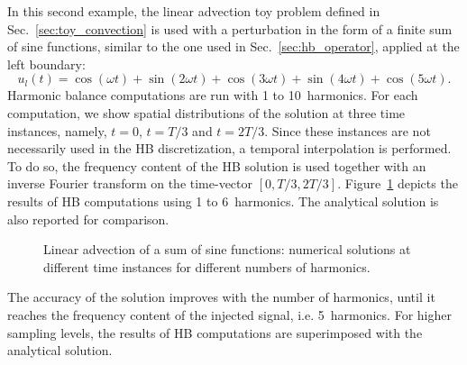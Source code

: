 
In this second example, the linear advection toy problem 
defined in Sec.~\ref{sec:toy_convection} is used with
a perturbation 
in the form of a finite sum of sine functions, similar to the one used
in Sec.~\ref{sec:hb_operator},
applied at the left boundary:
\begin{equation}
    u_l(t) = \cos(\omega t) + \sin(2 \omega t) +
    \cos(3 \omega t) + \sin(4 \omega t) + \cos(5 \omega t).
    \label{eq:sum_injected_fct}
\end{equation}
Harmonic balance computations are run with 1 to 10~harmonics.
For each computation, we show spatial distributions of the solution
at three time instances, namely, $t=0$, $t=T/3$ and $t=2T/3$.
Since these instances are not necessarily used in the HB discretization,
a temporal interpolation is performed.
To do so, the frequency content of the HB solution is used
together with an inverse Fourier transform on the time-vector
$[0, T/3, 2T/3]$.
Figure~\ref{fig:inj_sine_results} depicts the results of HB computations
using 1 to 6~harmonics. The analytical solution is also reported for comparison.

\begin{figure}[htb]
  \centering
  \caption{Linear advection of a sum of sine functions: 
  numerical solutions at different time instances for different numbers of harmonics.}
  \label{fig:inj_sine_results}
\end{figure}

The accuracy of the solution 
improves with the number of harmonics,
until it reaches the frequency content
of the injected signal, i.e. 5~harmonics.
For higher sampling levels, the results of HB computations are
superimposed with the analytical solution. 

